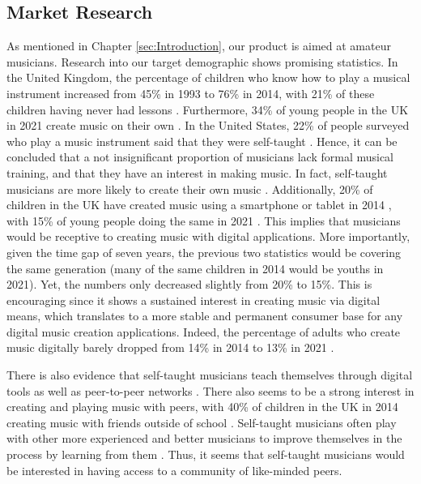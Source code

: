 \subsection{Market Research}
\label{marketresearch}
As mentioned in Chapter \ref{sec:Introduction}, our product is aimed at amateur musicians. Research into our target demographic shows promising statistics. In the United Kingdom, the percentage of children who know how to play a musical instrument increased from 45\% in 1993 to 76\% in 2014, with 21\% of these children having never had lessons \cite{abrsm2014}. Furthermore, 34\% of young people in the UK in 2021 create music on their own \cite{abrsm2021}. In the United States, 22\% of people surveyed who play a music instrument said that they were self-taught \cite{gallup2003}. Hence, it can be concluded that a not insignificant proportion of musicians lack formal musical training, and that they have an interest in making music. In fact, self-taught musicians are more likely to create their own music \cite{compareguitarpiano}. Additionally, 20\% of children in the UK have created music using a smartphone or tablet in 2014 \cite{abrsm2014}, with 15\% of young people doing the same in 2021 \cite{abrsm2021}. This implies that musicians would be receptive to creating music with digital applications. More importantly, given the time gap of seven years, the previous two statistics would be covering the same generation (many of the same children in 2014 would be youths in 2021). Yet, the numbers only decreased slightly from 20\% to 15\%. This is encouraging since it shows a sustained interest in creating music via digital means, which translates to a more stable and permanent consumer base for any digital music creation applications. Indeed, the percentage of adults who create music digitally barely dropped from 14\% in 2014 to 13\% in 2021 \cite{abrsm2021}.
 
There is also evidence that self-taught musicians teach themselves through digital tools as well as peer-to-peer networks \cite{abrsm2014} \cite{bookreview}. There also seems to be a strong interest in creating and playing music with peers, with 40\% of children in the UK in 2014 creating music with friends outside of school \cite{abrsm2014}. Self-taught musicians often play with other more experienced and better musicians to improve themselves in the process by learning from them \cite{marketresearch5}. Thus, it seems that self-taught musicians would be interested in having access to a community of like-minded peers. 
 
